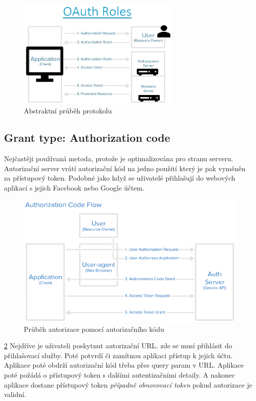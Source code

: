 \begin{figure}[H]
    \centering
    \includegraphics[width=0.7\textwidth]{figures/OAuth_abstract_flow.png}
    \caption{Abstraktní průběh protokolu}%
    \label{fig:Oauth_roles_diagram}
\end{figure}

\subsection{Grant type: Authorization code}
Nejčastěji používaná metoda, protože je optimalizována pro stranu serveru. Autorizační server vrátí autorizační kód na jedno použití který je pak vyměněn za přístupový token. Podobné jako když se uživatelé přihlašují do webových aplikací s jejich Facebook nebo Google účtem.

\begin{figure}[ht]
    \centering
    \includegraphics[width=\textwidth]{figures/OAuth_code_flow.png}
    \caption[short]{Průběh autorizace pomocí autorizačního kódu}%
    \label{fig:Oauth_auth_flow}
\end{figure}


\ref{fig:Oauth_auth_flow} Nejdříve je uživateli poskytnut autorizační URL. zde se musí přihlásit do přihlašovací služby. Poté potvrdí či zamítnou aplikaci přístup k jejich účtu. Aplikace poté obdrží autorizační kód třeba přes query param %
v URL. Aplikace poté požádá o přístupový token s dalšími autentizačními detaily. A nakonec aplikace dostane přístupový token \textit{případně obnovovací token} pokud autorizace je validní.


